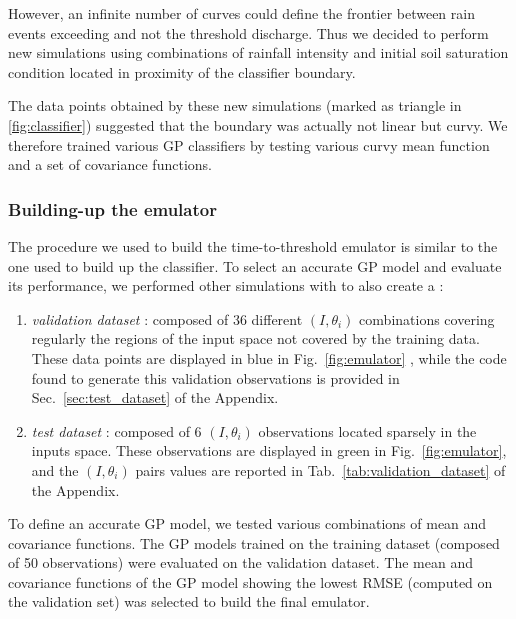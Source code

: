 However, an infinite number of curves could define the frontier between rain events exceeding and not the threshold discharge. Thus we decided to perform new simulations using combinations of rainfall intensity and initial soil saturation condition located in proximity of the classifier boundary. 

The data points obtained by these new simulations (marked as triangle in \ref{fig:classifier}) suggested that the boundary was actually not linear but curvy. 
We therefore trained various GP classifiers by testing various curvy mean function and a set of covariance functions.


\subsubsection{Building-up the emulator}
The procedure we used to build the time-to-threshold emulator is similar to the one used to build up the classifier.
To select an accurate GP model and evaluate its performance, we performed other simulations with  to also create a : 

\begin{enumerate}
   \item \emph{validation dataset} : composed of \num{36} different $(I, \theta_i)$ combinations covering regularly the regions of the input space not covered by the training data. These data points are displayed in blue in Fig.~\ref{fig:emulator} , while the code found to generate this validation observations is provided in Sec.~\ref{sec:test_dataset} of the Appendix.
   \item \emph{test dataset} : composed of \num{6} $(I, \theta_i)$ observations located sparsely in the inputs space. These observations are displayed in green in Fig.~\ref{fig:emulator}, and the $(I, \theta_i)$ pairs values  are reported in Tab.~\ref{tab:validation_dataset} of the Appendix.
\end{enumerate}

To define an accurate GP model, we tested various combinations of mean and covariance functions. 
The GP models trained on the training dataset (composed of 50 observations) were evaluated on the validation dataset. The mean and covariance functions of the GP model showing the lowest RMSE (computed on the validation set) was selected to build the final emulator. 

